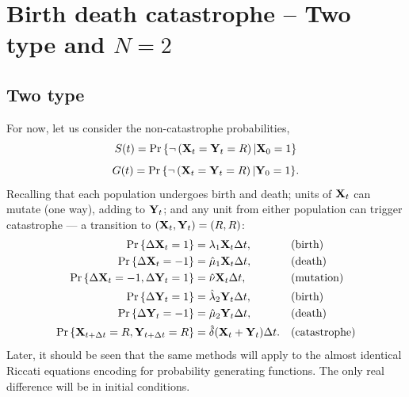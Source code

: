




\chapter{Birth death catastrophe -- Two type and $N=2$}






















































\section{Two type}







For now, let us consider the non-catastrophe probabilities, 
$$ S(t) = {\text{Pr}\left\{\neg\left({{\bf X}_t} = {{\bf Y}_t} = R\right)| {\bf X}_0 = 1\right\}} $$ 
$$G(t) = {\text{Pr}\left\{\neg\left({{\bf X}_t} = {{\bf Y}_t} = R\right)| {\bf Y}_0 = 1\right\}}.$$
Recalling that each population undergoes birth and death; units of ${{\bf X}_t}$ can mutate (one way), adding to ${{\bf Y}_t}$; and any unit from either population can trigger catastrophe --- a transition to $({{\bf X}_t}, {{\bf Y}_t}) = (R, R)$:
\begin{align*}
{\text{Pr}\left\{\Delta {{\bf X}_t}= 1\right\}} &=  {\lambda_1} {{\bf X}_t} \Delta t, && \text{(birth)}\\
{\text{Pr}\left\{\Delta {{\bf X}_t} = -1\right\}} &=  \hat\mu_1 {{\bf X}_t} \Delta t, && \text{(death)}\\
{\text{Pr}\left\{\Delta {{\bf X}_t} = -1,  \Delta {{\bf Y}_t} = 1\right\}} &=  \hat\nu {{\bf X}_t} \Delta t, && \text{(mutation)}\\
{\text{Pr}\left\{ \Delta {{\bf Y}_t} = 1\right\}} &=  \hat\lambda_2 {{\bf Y}_t} \Delta t, && \text{(birth)}\\
{\text{Pr}\left\{ \Delta {{\bf Y}_t} = -1\right\}} &=  \hat\mu_2 {{\bf Y}_t} \Delta t, && \text{(death)}\\
{\text{Pr}\left\{ {{\bf X}_{t+\Delta t}} = R,   {{\bf Y}_{t+\Delta t}} = R\right\}} &=  \hat\delta ( {{\bf X}_t}  + {{\bf Y}_t}) \Delta t. && \text{(catastrophe)}
\end{align*}
Later, it should be seen that the same methods will apply to the almost identical Riccati equations encoding for probability generating functions. The only real difference will be in initial conditions. \par

